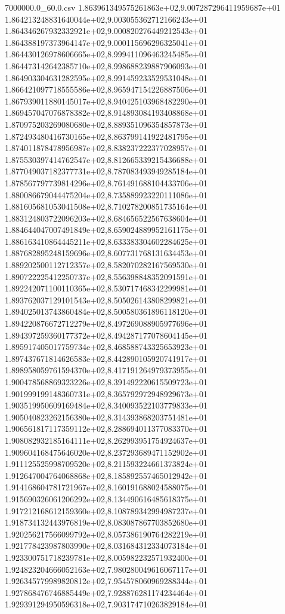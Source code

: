 \begin{filecontents*}{7000000.0_60.0.csv}
1.863961349575261863e+02,9.007287296411959687e+01
1.864213248831640044e+02,9.003055362712166243e+01
1.864346267932332921e+02,9.000820276449212543e+01
1.864388197373964147e+02,9.000115696296325041e+01
1.864430126978606665e+02,8.999411096463245485e+01
1.864473142642385710e+02,8.998688239887906093e+01
1.864903304631282595e+02,8.991459233529531048e+01
1.866421097718555586e+02,8.965947154226887506e+01
1.867939011880145017e+02,8.940425103968482290e+01
1.869457047076878382e+02,8.914893084193408868e+01
1.870975203269080680e+02,8.889351096354857873e+01
1.872493480416730165e+02,8.863799141922481795e+01
1.874011878478956987e+02,8.838237222377028957e+01
1.875530397414762547e+02,8.812665339215436688e+01
1.877049037182377731e+02,8.787083493949285184e+01
1.878567797739814296e+02,8.761491688104433706e+01
1.880086679044475204e+02,8.735889923220111086e+01
1.881605681053041508e+02,8.710278200851735164e+01
1.883124803722096203e+02,8.684656522567638604e+01
1.884644047007491849e+02,8.659024889952161175e+01
1.886163410864445211e+02,8.633383304602284625e+01
1.887682895248159696e+02,8.607731768131634453e+01
1.889202500112712357e+02,8.582070282167569530e+01
1.890722225412250737e+02,8.556398848352091591e+01
1.892242071100110365e+02,8.530717468342299981e+01
1.893762037129101543e+02,8.505026143808299821e+01
1.894025013743860484e+02,8.500580361896118120e+01
1.894220876672712279e+02,8.497269088905977696e+01
1.894397259360177372e+02,8.494287177078604145e+01
1.895917405017759734e+02,8.468588743325653923e+01
1.897437671814626583e+02,8.442890105920741917e+01
1.898958059761594370e+02,8.417191264979373955e+01
1.900478568869323226e+02,8.391492220615509723e+01
1.901999199148360731e+02,8.365792972948929673e+01
1.903519950609169484e+02,8.340093522103779833e+01
1.905040823262156380e+02,8.314393868203751481e+01
1.906561817117359112e+02,8.288694011377083370e+01
1.908082932185164111e+02,8.262993951754924637e+01
1.909604168475646020e+02,8.237293689471152902e+01
1.911125525998709520e+02,8.211593224661373824e+01
1.912647004764068868e+02,8.185892557465012942e+01
1.914168604781721967e+02,8.160191688024588075e+01
1.915690326061206292e+02,8.134490616485618375e+01
1.917212168612159360e+02,8.108789342994987237e+01
1.918734132443976819e+02,8.083087867703852680e+01
1.920256217566099792e+02,8.057386190764282219e+01
1.921778423987803990e+02,8.031684312334073184e+01
1.923300751718239781e+02,8.005982232571932400e+01
1.924823204666052163e+02,7.980280049616067117e+01
1.926345779989820812e+02,7.954578060969288344e+01
1.927868476746885449e+02,7.928876281174234464e+01
1.929391294950596318e+02,7.903174710263829184e+01

\end{filecontents*}
